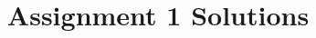 \documentclass[12pt]{coursedoc}
\title{Assignment 1 Solutions}
\begin{document}
\maketitle

\begin{description}
\end{description}
\end{document}
